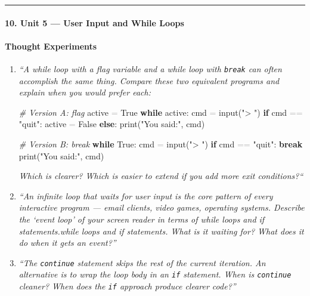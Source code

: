 \documentclass[
  justified,
  openright,
]{tufte-book}
\let\subsection\paragraph
\let\paragraph\paragraph
\newcommand{\KeywordTok}[1]{\textcolor{CodeKeyword}{\textbf{#1}}}  %
\newcommand{\StringTok}[1]{\textcolor{CodeString}{#1}}              %
\newcommand{\CommentTok}[1]{\textcolor{CodeComment}{\textit{#1}}}  %
\newcommand{\OperatorTok}[1]{\textcolor{DarkGray}{#1}}              %
\newenvironment{Shaded}{%
  \begin{mdframed}[style=TufteCode]%
}{%
  \end{mdframed}%
}
\let\subsection\paragraph
\let\paragraph\paragraph
\begin{document}
\begin{center}\rule{0.5\linewidth}{0.5pt}\end{center}

\subsection{10. Unit 5 --- User Input and While
Loops}\label{unit-5-user-input-and-while-loops}

\subsection{Thought Experiments}\label{thought-experiments-13}

\begin{enumerate}
\def\labelenumi{\arabic{enumi}.}
\item
  \emph{``A while loop with a flag variable and a while loop with
  \texttt{break} can often accomplish the same thing. Compare these two
  equivalent programs and explain when you would prefer each:}

\begin{Shaded}
\begin{Highlighting}[]
\CommentTok{\# Version A: flag}
active \OperatorTok{=} True
\KeywordTok{while} active:
    cmd \OperatorTok{=} input(\StringTok{"\textgreater{} "})
    \KeywordTok{if} cmd \OperatorTok{==} \StringTok{"quit"}: active \OperatorTok{=} False
    \KeywordTok{else}: print(\StringTok{"You said:"}, cmd)
 
\CommentTok{\# Version B: break}
\KeywordTok{while} True:
    cmd \OperatorTok{=} input(\StringTok{"\textgreater{} "})
    \KeywordTok{if} cmd \OperatorTok{==} \StringTok{"quit"}: \KeywordTok{break}
    print(\StringTok{"You said:"}, cmd)
\end{Highlighting}
\end{Shaded}

  \emph{Which is clearer? Which is easier to extend if you add more exit
  conditions?{\kern0pt}``}
\item
  \emph{``An infinite loop that waits for user input is the core pattern
  of every interactive program --- email clients, video games, operating
  systems. Describe the `event loop' of your screen reader in terms of
  while loops and if statements.while loops and if statements.
What is it waiting for? What does it do}
  \emph{when it gets an event?''}
\item
  \emph{``The \texttt{continue} statement skips the rest of the current
  iteration. An alternative is to wrap the loop body in an \texttt{if}
  statement. When is \texttt{continue} cleaner? When does the
  \texttt{if} approach produce clearer code?''}
\end{enumerate}
\end{document}
